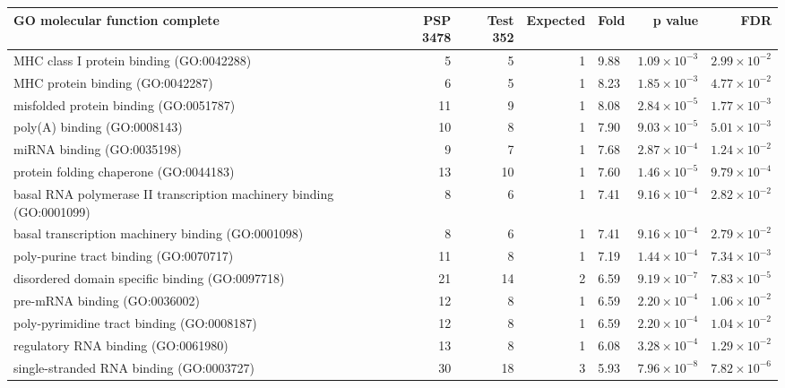\begin{table}[ht]
\centering
\begin{adjustbox}{width=\textwidth}
\begin{tabular}{lrrrlrr}
  \hline
GO molecular function complete & PSP 3478 & Test 352 & Expected & Fold & p value & FDR \\ 
  \hline
MHC class I protein binding (GO:0042288) & 5 & 5 & 1 & 9.88 & $1.09 \times 10^{-3}$ & $2.99 \times 10^{-2}$ \\ 
  MHC protein binding (GO:0042287) & 6 & 5 & 1 & 8.23 & $1.85 \times 10^{-3}$ & $4.77 \times 10^{-2}$ \\ 
  misfolded protein binding (GO:0051787) & 11 & 9 & 1 & 8.08 & $2.84 \times 10^{-5}$ & $1.77 \times 10^{-3}$ \\ 
  poly(A) binding (GO:0008143) & 10 & 8 & 1 & 7.90 & $9.03 \times 10^{-5}$ & $5.01 \times 10^{-3}$ \\ 
  miRNA binding (GO:0035198) & 9 & 7 & 1 & 7.68 & $2.87 \times 10^{-4}$ & $1.24 \times 10^{-2}$ \\ 
  protein folding chaperone (GO:0044183) & 13 & 10 & 1 & 7.60 & $1.46 \times 10^{-5}$ & $9.79 \times 10^{-4}$ \\ 
  basal RNA polymerase II transcription machinery binding (GO:0001099) & 8 & 6 & 1 & 7.41 & $9.16 \times 10^{-4}$ & $2.82 \times 10^{-2}$ \\ 
  basal transcription machinery binding (GO:0001098) & 8 & 6 & 1 & 7.41 & $9.16 \times 10^{-4}$ & $2.79 \times 10^{-2}$ \\ 
  poly-purine tract binding (GO:0070717) & 11 & 8 & 1 & 7.19 & $1.44 \times 10^{-4}$ & $7.34 \times 10^{-3}$ \\ 
  disordered domain specific binding (GO:0097718) & 21 & 14 & 2 & 6.59 & $9.19 \times 10^{-7}$ & $7.83 \times 10^{-5}$ \\ 
  pre-mRNA binding (GO:0036002) & 12 & 8 & 1 & 6.59 & $2.20 \times 10^{-4}$ & $1.06 \times 10^{-2}$ \\ 
  poly-pyrimidine tract binding (GO:0008187) & 12 & 8 & 1 & 6.59 & $2.20 \times 10^{-4}$ & $1.04 \times 10^{-2}$ \\ 
  regulatory RNA binding (GO:0061980) & 13 & 8 & 1 & 6.08 & $3.28 \times 10^{-4}$ & $1.29 \times 10^{-2}$ \\ 
  single-stranded RNA binding (GO:0003727) & 30 & 18 & 3 & 5.93 & $7.96 \times 10^{-8}$ & $7.82 \times 10^{-6}$ \\ 

\end{tabular}
\end{adjustbox}
\end{table}
